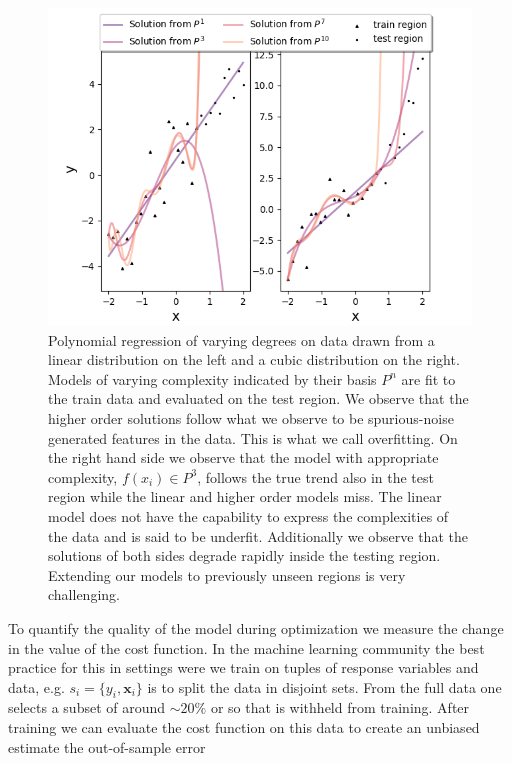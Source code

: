 \begin{figure}
\centering
\includegraphics[width=\textwidth]{../figures/y_distr.png}
\caption[Illustrating overfitting with polynomial regression]{Polynomial regression of varying degrees on data drawn from a linear distribution on the left and a cubic distribution on the right. Models of varying complexity indicated by their basis $P^n$ are fit to the train data and evaluated on the test region. We observe that the higher order solutions follow what we observe to be  spurious-noise generated features in the data. This is what we call overfitting. On the right hand side we observe that the model with appropriate complexity, $f(x_i) \in P^3$, follows the true trend also in the test region while the linear and higher order models miss. The linear model does not have the capability to express the complexities of the data and is said to be underfit. Additionally we observe that the solutions of both sides degrade rapidly inside the testing region. Extending our models to previously unseen regions is very challenging.}\label{fig:overfit}
\end{figure}

\noindent To quantify the quality of the model during optimization we measure the change in the value of the cost function. In the machine learning community the best practice for this in settings were we train on tuples of response variables and data, e.g. $s_i = \{y_i, \mathbf{x}_i\}$ is to split the data in disjoint sets. From the full data one selects a subset of around $\sim 20\%$ or so that is withheld from training. After training we can evaluate the cost function on this data to create an unbiased estimate the out-of-sample error

